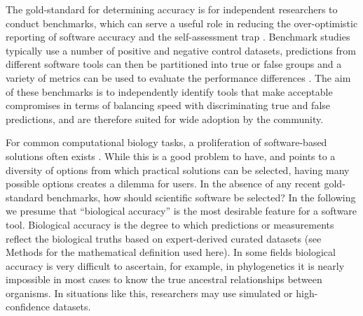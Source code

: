 \documentclass[fleqn,10pt]{SelfArx} %
\begin{document}
The gold-standard for determining accuracy is for independent
researchers to conduct benchmarks, which can serve a useful role in
reducing the over-optimistic reporting of software accuracy
\cite{Boulesteix2010-te,Jelizarow2010-zf,Weber:2019} and the self-assessment trap
\cite{Norel2011-cq,Buchka:2021}. Benchmark studies typically use a number of
positive and negative control datasets, predictions from different software tools can then be
partitioned into true or false groups and a variety of metrics can be
used to evaluate the performance differences
\cite{Egan1975-nd,Hall2012-kg,Weber:2019}.
The aim of these benchmarks is to independently identify tools that
make acceptable compromises in terms of balancing speed with
discriminating true and false predictions, and are therefore suited
for wide adoption by the community.

For common computational biology tasks, a proliferation of
software-based solutions often exists
\cite{Felsenstein1995-ic,Altschul2013-bv,Henry2014-ut}. While
this is a good problem to have, and points to a
diversity of options from which practical solutions can be selected,
having many possible options creates a dilemma for users. In the absence of
any recent gold-standard benchmarks, how should scientific software be
selected? In the following we presume that ``biological
accuracy'' is the most desirable feature for a software tool. Biological
accuracy is the degree to which predictions or measurements reflect
the biological truths based on expert-derived curated datasets (see Methods for the  mathematical definition used here). In some
fields biological accuracy is very difficult to ascertain, for
example, in phylogenetics it is nearly impossible in most cases to know the
true ancestral relationships between organisms. In situations like this,
researchers may use simulated or high-confidence datasets.
\end{document}
